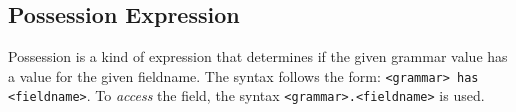 
\subsection{Possession Expression}
\label{subsec:possession}
{
	Possession is a kind of expression that determines
	if the given grammar value has a value for the given fieldname.
	The syntax follows the form: \texttt{<grammar> has <fieldname>}.
	To \textit{access} the field, the syntax \texttt{<grammar>.<fieldname>}
	is used.
}
